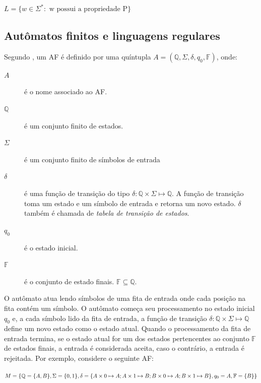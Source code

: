 \documentclass[12pt,a4paper]{article}
\begin{document}
\begin{center}
$L = \{w \in \Sigma^*: \mbox{ w possui a propriedade P}\}$
\end{center}

\subsection{Autômatos finitos e linguagens regulares}

Segundo , um AF é definido por
uma quíntupla $A = (\mathbb{Q},\Sigma,\delta,q_0,\mathbb{F})$, onde:

\begin{description}
\item[$A$] é o nome associado ao AF.
\item[$\mathbb{Q}$] é um conjunto finito de estados.
\item[$\Sigma$] é um conjunto finito de símbolos de entrada
\item[$\delta$] é uma função de transição do tipo $\delta: \mathbb{Q} \times \Sigma \mapsto \mathbb{Q}$.
A função de transição toma um estado e um símbolo de entrada e retorna um novo estado.
$\delta$ também é chamada de \textit{tabela de transição de estados}.
\item[$q_0$] é o estado inicial.
\item[$\mathbb{F}$] é o conjunto de estado finais. $\mathbb{F} \subseteq \mathbb{Q}$.
\end{description}

O autômato atua lendo símbolos de uma fita de entrada onde cada posição na fita
contém um símbolo. O autômato começa seu processamento no estado inicial $q_0$ e,
a cada símbolo lido da fita de entrada, a função de transição
$\delta: \mathbb{Q} \times \Sigma \mapsto \mathbb{Q}$ define um novo estado como o estado atual.
Quando o processamento da fita de entrada termina, se o estado atual for
um dos estados pertencentes ao conjunto $\mathbb{F}$ de estados finais, a entrada é
considerada aceita, caso o contrário, a entrada é rejeitada. Por exemplo,
considere o seguinte AF:

\begin{center}
$M = \{ \mathbb{Q} = \{A,B\}, \break \Sigma = \{0,1\}, \break
\delta = \{A \times 0 \mapsto A; A \times 1 \mapsto B; B \times 0 \mapsto A; B \times 1 \mapsto B\}, \break
q_0 = A, \break \mathbb{F} = \{B\} \}$
\end{center}
\end{document}

